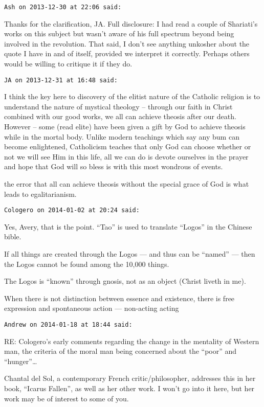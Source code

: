 \begin{footnotesize}
\begin{sffamily}
\hfill

\texttt{Ash on 2013-12-30 at 22:06 said: }

Thanks for the clarification, JA. Full disclosure: I had read a couple of Shariati's works on this subject but wasn't aware of his full spectrum beyond being involved in the revolution. That said, I don't see anything unkosher about the quote I have in and of itself, provided we interpret it correctly. Perhaps others would be willing to critique it if they do.


\hfill

\texttt{JA on 2013-12-31 at 16:48 said: }

I think the key here to discovery of the elitist nature of the Catholic religion is to understand the nature of mystical theology – through our faith in Christ combined with our good works, we all can achieve theosis after our death. However – some (read elite) have been given a gift by God to achieve theosis while in the mortal body. Unlike modern teachings which say any bum can become enlightened, Catholicism teaches that only God can choose whether or not we will see Him in this life, all we can do is devote ourselves in the prayer and hope that God will so bless is with this most wondrous of events. 

the error that all can achieve theosis without the special grace of God is what leads to egalitarianism.


\hfill

\texttt{Cologero on 2014-01-02 at 20:24 said: }

Yes, Avery, that is the point. “Tao” is used to translate “Logos” in the Chinese bible.

If all things are created through the Logos — and thus can be “named” — then the Logos cannot be found among the 10,000 things.

The Logos is “known” through gnosis, not as an object (Christ liveth in me).

When there is not distinction between essence and existence, there is free expression and spontaneous action — non-acting acting


\hfill

\texttt{Andrew on 2014-01-18 at 18:44 said: }

RE: Cologero's early comments regarding the change in the mentality of Western man, the criteria of the moral man being concerned about the “poor” and “hunger”…

Chantal del Sol, a contemporary French critic/philosopher, addresses this in her book, “Icarus Fallen”, as well as her other work. I won't go into it here, but her work may be of interest to some of you.


\end{sffamily}\end{footnotesize}
